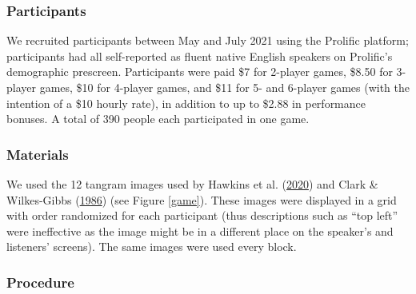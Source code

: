 \documentclass[
  english,
  a4paper,
]{article}
\begin{document}
\hypertarget{participants}{%
\subsubsection{Participants}\label{participants}}

We recruited participants between May and July 2021 using the Prolific platform; participants had all self-reported as fluent native English speakers on Prolific's demographic prescreen. Participants were paid \$7 for 2-player games, \$8.50 for 3-player games, \$10 for 4-player games, and \$11 for 5- and 6-player games (with the intention of a \$10 hourly rate), in addition to up to \$2.88 in performance bonuses. A total of 390 people each participated in one game.

\hypertarget{materials}{%
\subsubsection{Materials}\label{materials}}

We used the 12 tangram images used by Hawkins et al. (\protect\hyperlink{ref-hawkinsCharacterizingDynamicsLearning2020}{2020}) and Clark \& Wilkes-Gibbs (\protect\hyperlink{ref-clarkReferringCollaborativeProcess1986}{1986}) (see Figure \ref{game}). These images were displayed in a grid with order randomized for each participant (thus descriptions such as ``top left'' were ineffective as the image might be in a different place on the speaker's and listeners' screens). The same images were used every block.

\hypertarget{procedure}{%
\subsubsection{Procedure}\label{procedure}}
\end{document}
